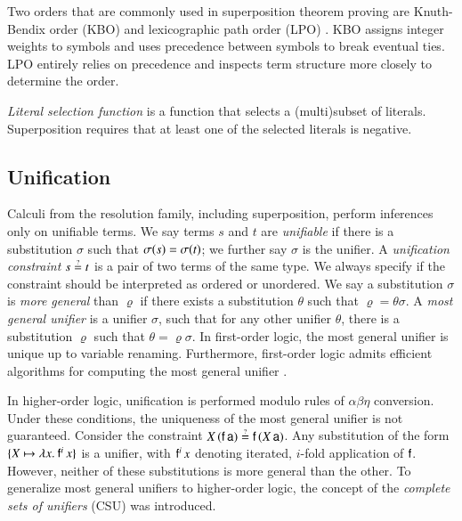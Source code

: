 Two orders that are commonly used in superposition theorem proving are
Knuth-Bendix order (KBO) \cite[Sect.~5.4.4]{bn-98-tr-and-all-that} and
lexicographic path order (LPO) \cite[Sect.~5.4.2]{bn-98-tr-and-all-that}.
KBO assigns integer weights to symbols and uses precedence between symbols to
break eventual ties. LPO entirely relies on precedence and inspects term
structure more closely to determine the order. 

\newcommand{\selfun}{\ensuremath{\mathit{Sel}}}
{\em Literal selection function} is a function that selects a (multi)subset of literals.
Superposition requires that at least one of the selected literals is negative. 

\subsection{Unification}
\label{sec:pre:unif}

Calculi from the resolution family, including superposition, perform inferences
only on unifiable terms. We say terms $s$ and $t$ are {\em unifiable} if there is a
substitution $\sigma$ such that $\sigma(s) = \sigma(t)$; we further say
$\sigma$ is the unifier. A \emph{unification constraint} $s \unif t$ is a pair of two terms of the same type. 
We always specify if the constraint should be interpreted as ordered or unordered.
We say a substitution $\sigma$ is \emph{more general} than $\varrho$ if there exists a substitution $\theta$
such that $\varrho = \theta\sigma$.
A \emph{most general unifier} is a
unifier $\sigma$, such that for any other unifier $\theta$, there is a
substitution $\varrho$ such that $\theta = \varrho\sigma$. In first-order logic,
the most general unifier is unique up to variable renaming. Furthermore,
first-order logic admits efficient algorithms for computing the most general
unifier \cite{hv-09-unifalgs}.

In higher-order logic, unification is performed modulo rules of
$\alpha\beta\eta$ conversion. Under these conditions, the uniqueness of the most
general unifier is not guaranteed. Consider the constraint $X \,
(\cst{f} \, \cst{a}) \unif \cst{f} \, (X \, \cst{a})$. Any substitution of the
form $\{ X \mapsto \lambda x.\> \mathsf{f}^i \, x \}$ is a unifier, with $\mathsf{f}^i \, x$
denoting iterated, $i$-fold application of $\mathsf{f}$. However, neither of these substitutions
is more general than the other. To generalize most general
unifiers to higher-order logic, the concept of the {\em complete sets of unifiers} (CSU) was
introduced.

